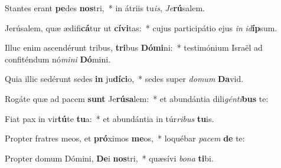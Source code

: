 \item Stantes erant \textbf{pe}des \textbf{nos}tri,~* in átriis tu\textit{is}, \textit{Je}\textbf{rú}salem.
\item Jerúsalem, quæ ædifi\textbf{cá}tur ut \textbf{cí}\textbf{vi}tas:~* cujus participátio ejus \textit{in} \textit{id}\textbf{íp}sum.
\item Illuc enim ascendérunt tribus, \textbf{tri}bus \textbf{Dó}\textbf{mi}ni:~* testimónium Israël ad confiténdum nó\textit{mi}\textit{ni} \textbf{Dó}mini.
\item Quia illic sedérunt sedes \textbf{in} ju\textbf{dí}\textbf{ci}o,~* sedes super \textit{do}\textit{mum} \textbf{Da}vid.
\item Rogáte quæ ad pacem \textbf{sunt} Je\textbf{rú}\textbf{sa}lem:~* et abundántia dili\textit{gén}\textit{ti}\textbf{bus} te:
\item Fiat pax in vir\textbf{tú}te \textbf{tu}a:~* et abundántia in túr\textit{ri}\textit{bus} \textbf{tu}is.
\item Propter fratres meos, et \textbf{pró}ximos \textbf{me}os,~* loquébar \textit{pa}\textit{cem} \textbf{de} te:
\item Propter domum Dómini, \textbf{De}i \textbf{nos}tri,~* quæsívi \textit{bo}\textit{na} \textbf{ti}bi.

